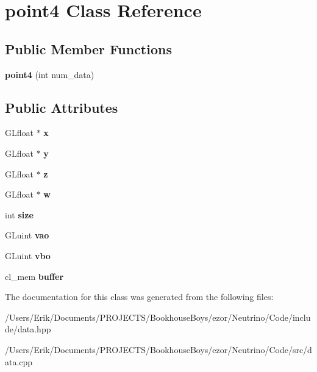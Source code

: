 \hypertarget{classpoint4}{}\section{point4 Class Reference}
\label{classpoint4}
\subsection*{Public Member Functions}
\begin{DoxyCompactItemize}
\item 
\mbox{\label{classpoint4_a53db7454b82867ea888d321b53fc2f43}} 
{\bfseries point4} (int num\+\_\+data)
\end{DoxyCompactItemize}
\subsection*{Public Attributes}
\begin{DoxyCompactItemize}
\item 
\mbox{\label{classpoint4_ab8ca3d442b4b43e4a93f1b22a421dfba}} 
G\+Lfloat $\ast$ {\bfseries x}
\item 
\mbox{\label{classpoint4_ab93dfe910a9fcaa21b57509155962081}} 
G\+Lfloat $\ast$ {\bfseries y}
\item 
\mbox{\label{classpoint4_ae3506e286dc92acc6d110945f6e2d637}} 
G\+Lfloat $\ast$ {\bfseries z}
\item 
\mbox{\label{classpoint4_a497ef121dc365931e57b3a7b8432f974}} 
G\+Lfloat $\ast$ {\bfseries w}
\item 
\mbox{\label{classpoint4_a7d00df3b3f89ad7c4c5ea069fda4bc57}} 
int {\bfseries size}
\item 
\mbox{\label{classpoint4_ab85c464e875d652229ee105bf9ba894f}} 
G\+Luint {\bfseries vao}
\item 
\mbox{\label{classpoint4_af027ab13576d0d376ccbf94852a74214}} 
G\+Luint {\bfseries vbo}
\item 
\mbox{\label{classpoint4_a9b807ca4daa8bf82e4ab63a0c44223b1}} 
cl\+\_\+mem {\bfseries buffer}
\end{DoxyCompactItemize}


The documentation for this class was generated from the following files\+:\begin{DoxyCompactItemize}
\item 
/\+Users/\+Erik/\+Documents/\+P\+R\+O\+J\+E\+C\+T\+S/\+Bookhouse\+Boys/ezor/\+Neutrino/\+Code/include/data.\+hpp\item 
/\+Users/\+Erik/\+Documents/\+P\+R\+O\+J\+E\+C\+T\+S/\+Bookhouse\+Boys/ezor/\+Neutrino/\+Code/src/data.\+cpp\end{DoxyCompactItemize}
